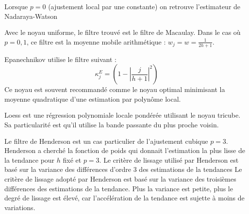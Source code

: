 \documentclass[
  12pt,
  ,
  french]{article}
\begin{document}
Lorsque \(p=0\) (ajustement local par une constante) on retrouve l'estimateur de Nadaraya-Watson

Avec le noyau uniforme, le filtre trouvé est le filtre de Macaulay. Dans le cas où \(p=0,1\), ce filtre est la moyenne mobile arithmétique : \(w_j=w=\frac{1}{2h+1}\).

Epanechnikov utilise le filtre suivant :
\[\kappa_j^E=\left(
  1-
  \left\lvert
  \frac j {h+1}
  \right\lvert^2
\right)\]
Ce noyau est souvent recommandé comme le noyau optimal minimisant la moyenne quadratique d'une estimation par polynôme local.

Loess est une régression polynomiale locale pondérée utilisant le noyau tricube. Sa particularité est qu'il utilise la bande passante du plus proche voisin.

Le filtre de Henderson est un cas particulier de l'ajustement cubique \(p=3\).
Henderson a cherché la fonction de poids qui donnait l'estimation la plus lisse de la tendance pour \(h\) fixé et \(p=3\).
Le critère de lissage utilisé par Henderson est basé sur la variance des différences d'ordre 3 des estimations de la tendances
Le critère de lissage adopté par Henderson est basé sur la variance des troisièmes différences des estimations de la tendance. Plus la variance est petite, plus le degré de lissage est élevé, car l'accélération de la tendance est sujette à moins de variations.
\end{document}
